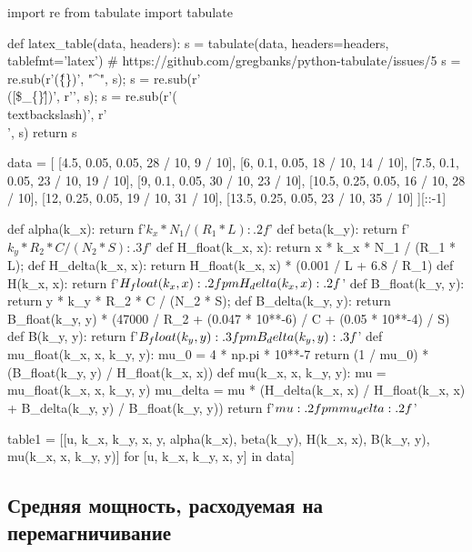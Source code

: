 \documentclass[12pt, a4paper]{article}
\begin{document}
\begin{pycode}
import re
from tabulate import tabulate

def latex_table(data, headers):
  s = tabulate(data, headers=headers, tablefmt='latex')
  # https://github.com/gregbanks/python-tabulate/issues/5
  s = re.sub(r'(\^\{\})', "^", s); s = re.sub(r'\\([\$\_\{\}\^])', r'\1', s); s = re.sub(r'(\\textbackslash{})', r'\\', s)
  return s

data = [
  [4.5, 0.05, 0.05, 28 / 10, 9 / 10],
  [6, 0.1, 0.05, 18 / 10, 14 / 10],
  [7.5, 0.1, 0.05, 23 / 10, 19 / 10],
  [9, 0.1, 0.05, 30 / 10, 23 / 10],
  [10.5, 0.25, 0.05, 16 / 10, 28 / 10],
  [12, 0.25, 0.05, 19 / 10, 31 / 10],
  [13.5, 0.25, 0.05, 23 / 10, 35 / 10]
][::-1]

def alpha(k_x): return f'${k_x * N_1 / (R_1 * L):.2f}$'
def beta(k_y): return f'${k_y * R_2 * C / (N_2 * S):.3f}$'
def H_float(k_x, x): return x * k_x * N_1 / (R_1 * L);
def H_delta(k_x, x): return H_float(k_x, x) * (0.001 / L + 6.8 / R_1)
def H(k_x, x): return f'${H_float(k_x, x):.2f} \\pm {H_delta(k_x, x):.2f}$'
def B_float(k_y, y): return y * k_y * R_2 * C / (N_2 * S);
def B_delta(k_y, y): return B_float(k_y, y) * (47000 / R_2 + (0.047 * 10**-6) / C + (0.05 * 10**-4) / S)
def B(k_y, y): return f'${B_float(k_y, y):.3f} \\pm {B_delta(k_y, y):.3f}$'
def mu_float(k_x, x, k_y, y):
  mu_0 = 4 * np.pi * 10**-7
  return (1 / mu_0) * (B_float(k_y, y) / H_float(k_x, x))
def mu(k_x, x, k_y, y):
  mu = mu_float(k_x, x, k_y, y)
  mu_delta = mu * (H_delta(k_x, x) / H_float(k_x, x) + B_delta(k_y, y) / B_float(k_y, y))
  return f'${mu:.2f} \\pm {mu_delta:.2f}$'

table1 = [[u, k_x, k_y, x, y, alpha(k_x), beta(k_y), H(k_x, x), B(k_y, y), mu(k_x, x, k_y, y)] for [u, k_x, k_y, x, y] in data]
\end{pycode}

\begin{table}[H]
\end{table}

\subsection*{Средняя мощность, расходуемая на перемагничивание}
\end{document}
